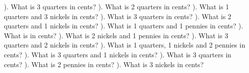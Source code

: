 \documentclass{article}%
\begin{document}
). What is 3 quarters in cents?%
\newline%
\newline%
). What is 2 quarters in cents?%
\newline%
\newline%
). What is 1 quarters and 3 nickels in cents?%
\newline%
\newline%
). What is 3 quarters in cents?%
\newline%
\newline%
). What is 2 quarters and 1 nickels in cents?%
\newline%
\newline%
). What is 1 quarters and 1 pennies in cents?%
\newline%
\newline%
). What is  in cents?%
\newline%
\newline%
). What is 2 nickels and 1 pennies in cents?%
\newline%
\newline%
). What is 3 quarters and 2 nickels in cents?%
\newline%
\newline%
). What is 1 quarters, 1 nickels and 2 pennies in cents?%
\newline%
\newline%
). What is 3 quarters and 1 nickels in cents?%
\newline%
\newline%
). What is 3 quarters in cents?%
\newline%
\newline%
). What is 2 pennies in cents?%
\newline%
\newline%
). What is 3 nickels in cents?%
\newline%
\end{document}
